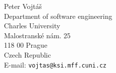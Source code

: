 \documentclass{book}
\begin{document}
\tableofcontents



{}

\medskip
\noindent Peter Vojt\'{a}\v{s}
\\Department of software engineering
\\Charles University
\\Malostransk\'{e} n\'{a}m. 25
\\118 00 Prague
\\Czech Republic
\\E-mail: \texttt{vojtas@ksi.mff.cuni.cz}


\EndPaper


%
%
%
%
%
%
%
%
%
%
%
%
%
%
%
%
%
%
%
%
\end{document}
